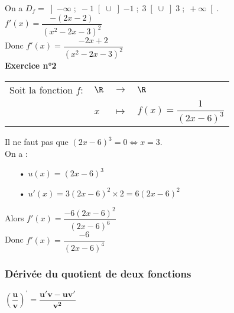 \vspace*{.3cm}

On a $D_f = \left]-\infty \; ; \; -1\right[\cup\left]-1\; ; \; 3\right[\cup \left]3 \; ; \; +\infty\right[$. \\

$f'(x) = \dfrac{-\left(2x - 2\right)}{\left(x^2 - 2x - 3\right)^2}$ \vspace*{.3cm} \\

Donc $f'(x) = \dfrac{-2x + 2}{\left(x^2 - 2x - 3\right)^2}$ \vspace*{.3cm} \\

\textbf{Exercice n°2} \\

\begin{tabular}{llll}
Soit la fonction $f :$ & $\R$ & $\longrightarrow$ & $\R$ \\
& $x$ & $\longmapsto$ & $f(x) = \dfrac{1}{\left(2x - 6\right)^3} $ \\
\end{tabular}

\vspace*{.3cm}

Il ne faut pas que $\left(2x - 6\right)^3 = 0 \Longleftrightarrow x = 3$. \\

On a :

\begin{itemize}
\item[•] $u(x) = \left(2x - 6\right)^3$ \\
\item[•] $u'(x) = 3\left(2x - 6\right)^2 \times 2 = 6\left(2x - 6\right)^2$ \\
\end{itemize}

\vspace*{.3cm}

Alors $f'(x) = \dfrac{-6\left(2x - 6\right)^2}{\left(2x - 6\right)^6}$ \\

Donc $f'(x) = \dfrac{-6}{\left(2x - 6\right)^4}$ \\

\newpage

\subsubsection{Dérivée du quotient de deux fonctions}

$\mathbf{\left(\dfrac{u}{v}\right)^{'} = \dfrac{u'v - uv'}{v^2}}$ \\

